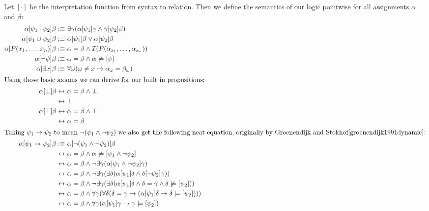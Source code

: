 \documentclass[12pt]{article}
\begin{document}
Let $[\cdot]$ be the interpretation function from syntax to relation. Then we define the semantics of our logic pointwise for all assignments $\alpha$ and $\beta$:
\begin{align}
\alpha[\psi_1\cdot\psi_2]\beta :\equiv&\ \exists\gamma (\alpha[\psi_1]\gamma \wedge \gamma[\psi_2]\beta) \label{sem_and} \\
\alpha[\psi_1\cup\psi_2]\beta :\equiv&\ \alpha[\psi_1]\beta \vee \alpha[\psi_2]\beta \label{sem_union} \\
\alpha[P(x_1,\dots,x_n)]\beta :\equiv&\ \alpha = \beta \wedge \mathcal{I}(P(\alpha_{x_1},\dots,\alpha_{x_n})) \label{sem_pred} \\
\alpha[\neg\psi]\beta :\equiv&\ \alpha = \beta \wedge \alpha\not\models[\psi] \label{sem_neg}\\
\alpha[\exists x]\beta :\equiv&\ \forall\omega (\omega \neq x \rightarrow \alpha_{\omega} = \beta_{\omega}) \label{sem_exists} \\
\intertext{Using those basic axioms we can derive for our built in propositions:}
\alpha[\bot]\beta \leftrightarrow&\ \alpha = \beta \wedge \bot \nonumber\\
                  \leftrightarrow&\ \bot \label{sem_bot}\\
\alpha[\top]\beta \leftrightarrow&\ \alpha = \beta \wedge \top \nonumber\\
                  \leftrightarrow&\ \alpha = \beta \label{sem_top}\\
\intertext{Taking $\psi_1\rightarrow\psi_2$ to mean $\neg(\psi_1\wedge\neg\psi_2)$ we also get the following neat equation, originally by Groenendijk and Stokhof\cite{groenendijk1991dynamic}:}
\alpha[\psi_1\rightarrow\psi_2]\beta
 :\equiv&\ \alpha[\neg(\psi_1\wedge\neg\psi_2)]\beta \nonumber\\
 \leftrightarrow&\ \alpha = \beta \wedge \alpha\not\models[\psi_1\wedge\neg\psi_2] \nonumber\\
 \leftrightarrow&\ \alpha = \beta \wedge \neg\exists\gamma(\alpha[\psi_1\wedge\neg\psi_2]\gamma) \nonumber\\
 \leftrightarrow&\ \alpha = \beta \wedge \neg\exists\gamma(\exists\delta(\alpha[\psi_1]\delta\wedge\delta[\neg\psi_2]\gamma)) \nonumber\\
 \leftrightarrow&\ \alpha = \beta \wedge \neg\exists\gamma(\exists\delta(\alpha[\psi_1]\delta\wedge\delta=\gamma\wedge\delta\not\models[\psi_2])) \nonumber\\
 \leftrightarrow&\ \alpha = \beta \wedge \forall\gamma(\forall\delta(\delta=\gamma\rightarrow(\alpha[\psi_1]\delta\rightarrow\delta\models[\psi_2]))) \nonumber\\
 \leftrightarrow&\ \alpha = \beta \wedge \forall\gamma(\alpha[\psi_1]\gamma\rightarrow\gamma\models[\psi_2]) \label{sem_impl}
\end{align}
\end{document}
